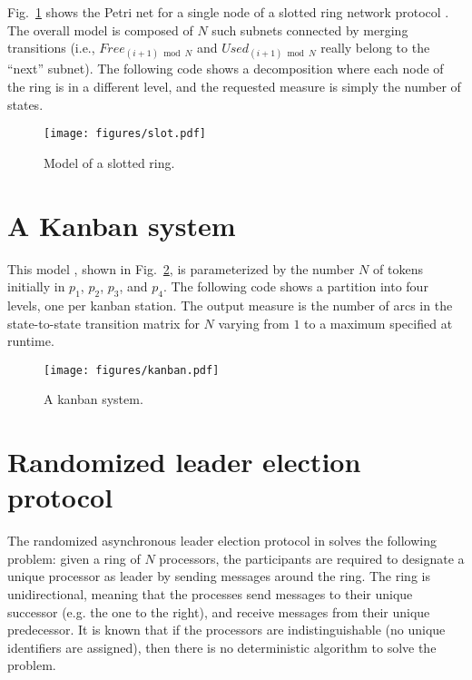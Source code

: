 Fig.~\ref{FIG:slotted} shows the Petri net for a single node of a slotted
ring network protocol \cite{Pastor1994}.
The overall model is composed of $N$
such subnets connected by merging transitions
(i.e., $\mathit{Free}_{(i+1) \bmod N}$ and $\mathit{Used}_{(i+1) \bmod N}$
really belong to the ``next'' subnet).
The following {\smart} code shows a decomposition where each
node of the ring is in a different level, and the requested
measure is simply the number of states.
%

%

\begin{figure}
  \centering
  \texttt{[image: figures/slot.pdf]}
  \caption{Model of a slotted ring.}
  \label{FIG:slotted}
\end{figure}


\section{A Kanban system}

This model \cite{1996WMPN-SNSkanban}, shown in Fig.~\ref{FIG:kanban},
is parameterized by the number $N$ of tokens initially
in $p_{1}$, $p_{2}$, $p_{3}$, and $p_{4}$.
The following code shows a partition into four levels, one per kanban station.
The output measure is the number of arcs in the state-to-state transition
matrix for $N$ varying from $1$ to a maximum specified at runtime.
\begin{figure}
  \centering
  \texttt{[image: figures/kanban.pdf]}
  \caption{A kanban system.}
  \label{FIG:kanban}
\end{figure}
%

%



\section{Randomized leader election protocol}

The randomized asynchronous leader election protocol in \cite{DolevKR82}
solves the following problem: given a ring of $N$ processors, the
participants are required to designate a unique processor as leader by
sending messages around the ring. The ring is unidirectional, meaning that
the processes send messages to their unique successor (e.g. the one to the
right), and receive messages from their unique predecessor. It is known that
if the processors are indistinguishable (no unique identifiers are
assigned), then there is no deterministic algorithm to solve the problem.

